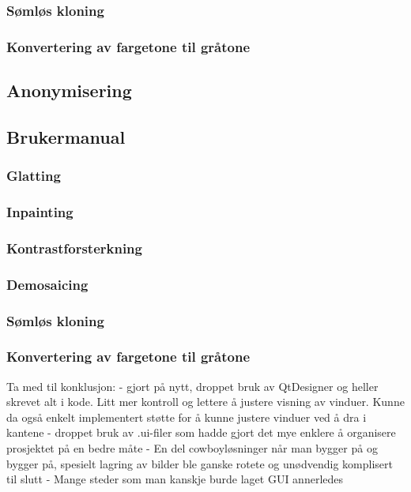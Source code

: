 \subsubsection{Sømløs kloning}


\subsubsection{Konvertering av fargetone til gråtone}


\subsection{Anonymisering}


\subsection{Brukermanual}


\subsubsection{Glatting}


\subsubsection{Inpainting}


\subsubsection{Kontrastforsterkning}


\subsubsection{Demosaicing}


\subsubsection{Sømløs kloning}


\subsubsection{Konvertering av fargetone til gråtone}


Ta med til konklusjon: 
- gjort på nytt, droppet bruk av QtDesigner og heller skrevet alt i kode. Litt mer kontroll og lettere å justere visning av vinduer. Kunne da også enkelt implementert støtte for å kunne justere vinduer ved å dra i kantene
- droppet bruk av .ui-filer som hadde gjort det mye enklere å organisere prosjektet på en bedre måte
- En del cowboyløsninger når man bygger på og bygger på, spesielt lagring av bilder ble ganske rotete og unødvendig komplisert til slutt
- Mange steder som man kanskje burde laget GUI annerledes
